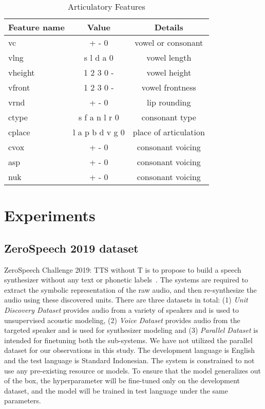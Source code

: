 \renewcommand{\arraystretch}{1.0}
\begin{table}[t]
\caption{Articulatory Features\label{tab:arti}}
\centering
\begin{tabular}{l | c | c}\toprule[\heavyrulewidth] \textbf{Feature name} & \textbf{Value} & \textbf{Details} \\
\toprule[\heavyrulewidth]
vc & + - 0 & vowel or consonant \\
vlng & s l d a 0 & vowel length\\
vheight & 1 2 3 0 - & vowel height \\
vfront & 1 2 3 0 - & vowel frontness\\
vrnd & + - 0 & lip rounding\\
ctype & s f a n l r 0 & consonant type \\
cplace & l a p b d v g 0 & place of articulation \\
cvox & + - 0 & consonant voicing\\
asp & + - 0 & consonant voicing\\
nuk & + - 0 & consonant voicing\\
\bottomrule[\heavyrulewidth]
\end{tabular}
\label{articulatory features}
\end{table}



\section{Experiments}
\label{expts}


\subsection{ZeroSpeech 2019 dataset}

ZeroSpeech Challenge 2019: TTS without T is to propose to build a speech synthesizer without any text or phonetic labels~\citep{sakti2008development1, sakti2008development2, zerospeech2019}. The systems are required to extract the symbolic representation of the raw audio, and then re-synthesize the audio using these discovered units. There are three datasets in total: (1) \textit{Unit Discovery Dataset} provides audio from a variety of speakers and is used to unsupervised acoustic modeling, (2)  \textit{Voice Dataset} provides audio from the targeted speaker and is used for synthesizer modeling and (3)  \textit{Parallel Dataset} is intended for finetuning both the sub-systems. We have not utilized the parallel dataset for our observations in this study. The development language is English and the test language is Standard Indonesian. The system is constrained to not use any pre-existing resource or models. To ensure that the model generalizes out of the box, the hyperparameter will be fine-tuned only on the development dataset, and the model will be trained in test language under the same parameters. 

